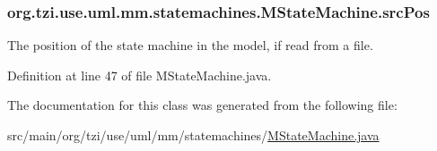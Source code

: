 \hypertarget{classorg_1_1tzi_1_1use_1_1uml_1_1mm_1_1statemachines_1_1_m_state_machine_a4892c5ab13ec73b51355c89b1eeb0cf1}{
\subsubsection[{src\-Pos}]{ org.\-tzi.\-use.\-uml.\-mm.\-statemachines.\-M\-State\-Machine.\-src\-Pos\hspace{0.3cm}{\ttfamily [protected]}}}\label{classorg_1_1tzi_1_1use_1_1uml_1_1mm_1_1statemachines_1_1_m_state_machine_a4892c5ab13ec73b51355c89b1eeb0cf1}
The position of the state machine in the model, if read from a file. 

Definition at line 47 of file M\-State\-Machine.\-java.



The documentation for this class was generated from the following file\-:\begin{DoxyCompactItemize}
\item 
src/main/org/tzi/use/uml/mm/statemachines/\hyperlink{_m_state_machine_8java}{M\-State\-Machine.\-java}\end{DoxyCompactItemize}
